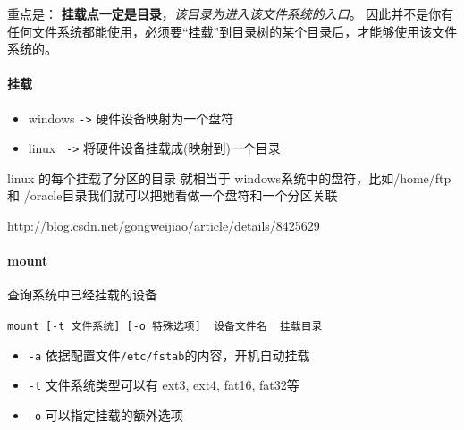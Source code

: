 \documentclass[UTF8,a4paper,12pt]{ctexbook}
\begin{document}
			重点是： \textbf{挂载点一定是目录}，\textit{该目录为进入该文件系统的入口}。 因此并不是你有任何文件系统都能使用，必须要“挂载”到目录树的某个目录后，才能够使用该文件系统的。
			
		\paragraph{挂载}
			\begin{itemize}
				\item windows \verb|->| 硬件设备映射为一个盘符
				\item linux \verb| ->| 将硬件设备挂载成(映射到)一个目录
			\end{itemize}

			linux 的每个挂载了分区的目录 就相当于 windows系统中的盘符，比如/home/ftp 和 /oracle目录我们就可以把她看做一个盘符和一个分区关联
			
			\url{http://blog.csdn.net/gongweijiao/article/details/8425629}
		\paragraph{mount}查询系统中已经挂载的设备
		
			\verb|mount [-t 文件系统] [-o 特殊选项]  设备文件名  挂载目录|
			
			\begin{itemize}
				\item \verb|-a| 依据配置文件\verb|/etc/fstab|的内容，开机自动挂载
				\item \verb|-t| 文件系统类型可以有 ext3, ext4, fat16, fat32等
				\item \verb|-o| 可以指定挂载的额外选项
			\end{itemize}
		
\end{document}
